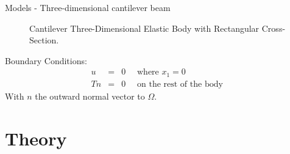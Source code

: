 \documentclass[8pt]{beamer}
\begin{document}
\begin{frame}{Models - Three-dimensional cantilever beam}
\begin{figure}[h!]
\begin{tikzpicture}[scale=0.58]
                \end{tikzpicture}
                \caption{Cantilever Three-Dimensional Elastic Body with Rectangular Cross-Section.}
            \end{figure} 
            Boundary Conditions:
            \begin{eqnarray*}
                u & = & 0 \quad \textrm{ where } x_1 = 0\\
                Tn & = & 0 \quad \textrm{ on the rest of the body }
            \end{eqnarray*} With $n$ the outward normal vector to $\Omega$.
        \end{frame}

\section{Theory}
\end{document}
